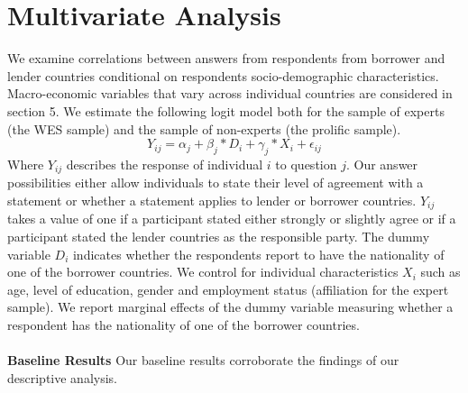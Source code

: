 \clearpage
\section{Multivariate Analysis}
We examine correlations between answers from respondents from borrower and lender countries conditional on respondents socio-demographic characteristics. Macro-economic variables that vary across individual countries are considered in section 5. We estimate the following logit model both for the sample of experts (the WES sample) and the sample of non-experts (the prolific sample). 
\begin{equation*}
    Y_{ij}= \alpha_{j}+ \beta_{j} *D_{i} + \gamma_{j}*X_{i} + \epsilon_{ij}
\end{equation*}
Where $Y_{ij}$ describes the response of individual $i$ to question $j$. Our answer possibilities either allow individuals to state their level of agreement with a statement or whether a statement applies to lender or borrower countries. $Y_{ij}$ takes a value of one if a participant stated either strongly or slightly agree or if a participant stated the lender countries as the responsible party. The dummy variable $D_{i}$ indicates whether the respondents report to have the nationality of one of the borrower countries. We control for individual characteristics $X_{i}$ such as age, level of education, gender and employment status (affiliation for the expert sample). 
We report marginal effects of the dummy variable measuring whether a respondent has the nationality of one of the borrower countries.
\\ \\
\textbf{Baseline Results} 
Our baseline results corroborate the findings of our descriptive analysis. \\ 
